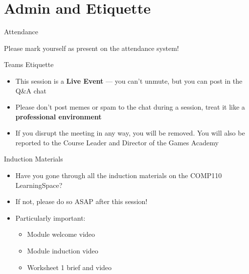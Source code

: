 \part{Admin and Etiquette}
\frame{\partpage}

\begin{frame}{Attendance}
    \begin{center}
        Please mark yourself as present on the attendance system!
    \end{center}
\end{frame}

\begin{frame}{Teams Etiquette}
    \begin{itemize}
        \pause\item This session is a \textbf{Live Event} --- you can't unmute, but you can post in the Q\&A chat
        \pause\item Please don't post memes or spam to the chat during a session, treat it like a \textbf{professional environment}
        \pause\item If you disrupt the meeting in any way, you will be removed. You will also be reported to the Course Leader and Director of the Games Academy
    \end{itemize}
\end{frame}


\begin{frame}{Induction Materials}
    \begin{itemize}
        \pause\item Have you gone through all the induction materials on the COMP110 LearningSpace?
        \pause\item If not, please do so ASAP after this session!
        \pause\item Particularly important:
        \begin{itemize}
            \pause\item Module welcome video
            \pause\item Module induction video
            \pause\item Worksheet 1 brief and video
        \end{itemize}
    \end{itemize}
\end{frame}

